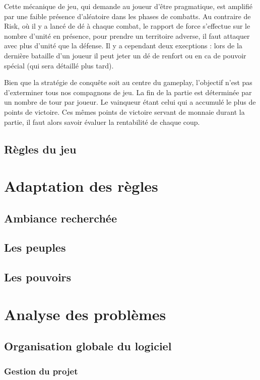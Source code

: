 \documentclass[11pt]{report}
\begin{document}
		Cette mécanique de jeu, qui demande au joueur d'être pragmatique, est amplifié par une faible présence d'aléatoire dans les phases de combatts. Au contraire de Risk\up{\copyright}, où il y a lancé de dé à chaque combat, le rapport de force s'effectue sur le nombre d'unité en présence, pour prendre un territoire adverse, il faut attaquer avec plus d'unité que la défense. Il y a cependant deux execptions : lors de la dernière bataille d'un joueur il peut jeter un dé de renfort ou en ca de pouvoir spécial (qui sera détaillé plus tard).
		
		Bien que la stratégie de conquête soit au centre du gameplay, l'objectif n'est pas d'exterminer tous nos compagnons de jeu. La fin de la partie est déterminée par un nombre de tour par joueur. Le vainqueur étant celui qui a accumulé le plus de points de victoire. Ces mêmes points de victoire servant de monnaie durant la partie, il faut alors savoir évaluer la rentabilité de chaque coup. 
	\section{Règles du jeu}

\chapter{Adaptation des règles}

	\section{Ambiance recherchée}

	\section{Les peuples}

	\section{Les pouvoirs}

\chapter{Analyse des problèmes}

	\section{Organisation globale du logiciel}

		\subsection{Gestion du projet}
\end{document}
